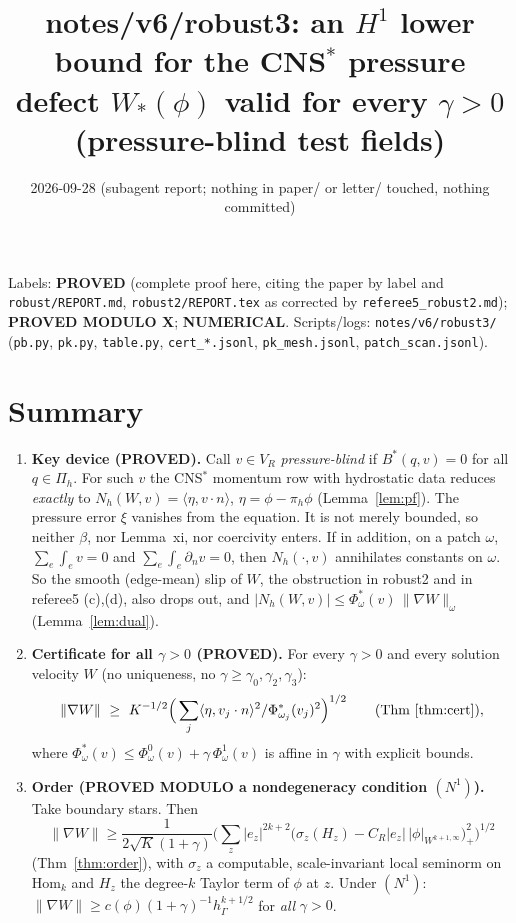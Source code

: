 \documentclass[11pt]{article}
\title{notes/v6/robust3: an $H^1$ lower bound for the CNS$^\ast$ pressure defect $W_\ast(\phi)$ valid for every $\gamma>0$\\ (pressure-blind test fields)}
\date{2026-09-28 (subagent report; nothing in paper/ or letter/ touched, nothing committed)}
\theoremstyle{remark}
\newcommand{\hG}{h_\Gamma}
\newcommand{\ip}[2]{\langle #1,#2\rangle}
\begin{document}
\maketitle

\noindent Labels: \textbf{PROVED} (complete proof here, citing the paper by label and \texttt{robust/REPORT.md},
\texttt{robust2/REPORT.tex} as corrected by \texttt{referee5\_robust2.md}); \textbf{PROVED MODULO X};
\textbf{NUMERICAL}. Scripts/logs: \texttt{notes/v6/robust3/} (\texttt{pb.py}, \texttt{pk.py}, \texttt{table.py},
\texttt{cert\_*.jsonl}, \texttt{pk\_mesh.jsonl}, \texttt{patch\_scan.jsonl}).

\section*{Summary}
\begin{enumerate}
\item \textbf{Key device (PROVED).} Call $v\in V_R$ \emph{pressure-blind} if $B^\ast(q,v)=0$ for all $q\in\Pi_h$. For such $v$ the
CNS$^\ast$ momentum row with hydrostatic data reduces \emph{exactly} to
$N_h(W,v)=\ip{\eta}{v\cdot n}$, $\eta=\phi-\pi_h\phi$ (Lemma~\ref{lem:pf}). The pressure error $\xi$ vanishes from the
equation. It is not merely bounded, so neither $\beta$, nor Lemma~xi, nor coercivity enters. If in addition, on a patch
$\omega$, $\sum_e\int_e v=0$ and $\sum_e\int_e\partial_nv=0$, then $N_h(\cdot,v)$ annihilates constants on $\omega$. So the
smooth (edge-mean) slip of $W$, the obstruction in robust2 and in referee5 (c),(d), also drops out, and
$|N_h(W,v)|\le\Phi^\ast_\omega(v)\,\|\nabla W\|_\omega$ (Lemma~\ref{lem:dual}).
\item \textbf{Certificate for all $\gamma>0$ (PROVED).} For every $\gamma>0$ and every solution velocity $W$ (no uniqueness,
no $\gamma\ge\gamma_0,\gamma_2,\gamma_3$):
\[
\|\nabla W\|\ \ge\ K^{-1/2}\Big(\sum_j\ip{\eta}{v_j\cdot n}^2/\Phi^\ast_{\omega_j}(v_j)^2\Big)^{1/2}
\qquad(\text{Thm~\ref{thm:cert}}),
\]
where $\Phi^\ast_\omega(v)\le\Phi^0_\omega(v)+\gamma\,\Phi^1_\omega(v)$ is affine in $\gamma$ with explicit bounds.
\item \textbf{Order (PROVED MODULO a nondegeneracy condition $(N^1)$).} Take boundary stars. Then
\[
\|\nabla W\|\ge\frac{1}{2\sqrt{K}(1+\gamma)}\Big(\sum_z|e_z|^{2k+2}\big(\sigma_z(H_z)-C_R|e_z|\,|\phi|_{W^{k+1,\infty}}\big)_+^2\Big)^{1/2}
\]
(Thm~\ref{thm:order}), with $\sigma_z$ a computable, scale-invariant local seminorm on $\mathrm{Hom}_k$ and $H_z$ the degree-$k$
Taylor term of $\phi$ at $z$. Under $(N^1)$: $\|\nabla W\|\ge c(\phi)(1+\gamma)^{-1}\hG^{k+1/2}$ for \emph{all} $\gamma>0$.

\end{enumerate}
\end{document}

